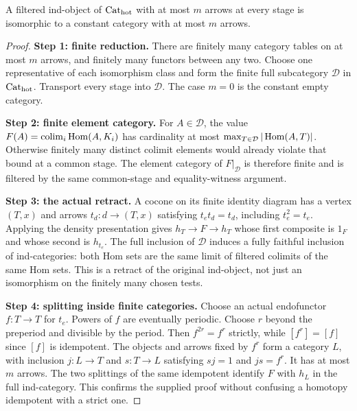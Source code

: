 \begin{proposition}\label{F:B9}
A filtered ind-object of $\mathrm {Cat}_{\mathrm{hot}}$ with at most $m$ arrows
at every stage is isomorphic to a constant category with at most $m$
arrows.
\end{proposition}
\begin{proof}
\textbf{Step 1: finite reduction.} There are finitely many category tables
on at most $m$ arrows, and finitely many functors between any two.
Choose one representative of each isomorphism class and form the finite
full subcategory $\mathcal D$ in $\mathrm {Cat}_{\mathrm{hot}}$. Transport every
stage into $\mathcal D$. The case $m=0$ is the constant empty category.

\textbf{Step 2: finite element category.} For $A\in\mathcal D$, the value
$F(A)=\operatorname{colim}_i\operatorname{Hom}(A,K_i)$ has cardinality at most
$\max_{T\in\mathcal D}|\operatorname{Hom}(A,T)|$. Otherwise finitely many distinct
colimit elements would already violate that bound at a common stage.
The element category of $F|_{\mathcal D}$ is therefore finite and is
filtered by the same common-stage and equality-witness argument.

\textbf{Step 3: the actual retract.} A cocone on its finite identity
diagram has a vertex $(T,x)$ and arrows $t_d:d\to(T,x)$ satisfying
$t_e t_d=t_d$, including $t_e^2=t_e$. Applying the density presentation
gives $h_T\to F\to h_T$ whose first composite is $1_F$ and whose second
is $h_{t_e}$. The full inclusion of $\mathcal D$ induces a fully faithful
inclusion of ind-categories: both Hom sets are the same limit of filtered
colimits of the same Hom sets. This is a retract of the original
ind-object, not just an isomorphism on the finitely many chosen tests.

\textbf{Step 4: splitting inside finite categories.} Choose an actual
endofunctor $f:T\to T$ for $t_e$. Powers of $f$ are eventually periodic.
Choose $r$ beyond the preperiod and divisible by the period. Then
$f^{2r}=f^r$ strictly, while $[f^r]=[f]$ since $[f]$ is idempotent.
The objects and arrows fixed by $f^r$ form a category $L$, with inclusion
$j:L\to T$ and $s:T\to L$ satisfying $sj=1$ and $js=f^r$.
It has at most $m$ arrows. The two splittings of the same idempotent
identify $F$ with $h_L$ in the full ind-category. This confirms the
supplied proof without confusing a homotopy idempotent with a strict one.
\end{proof}

